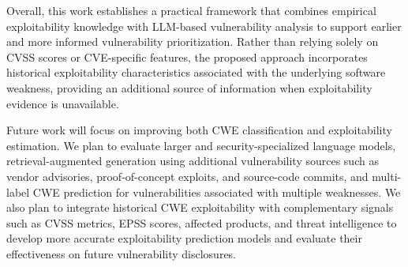 \documentclass[conference,compsoc]{IEEEtran}
\begin{document}
Overall, this work establishes a practical framework that combines empirical exploitability knowledge with LLM-based vulnerability analysis to support earlier and more informed vulnerability prioritization. Rather than relying solely on CVSS scores or CVE-specific features, the proposed approach incorporates historical exploitability characteristics associated with the underlying software weakness, providing an additional source of information when exploitability evidence is unavailable.

Future work will focus on improving both CWE classification and exploitability estimation. We plan to evaluate larger and security-specialized language models, retrieval-augmented generation using additional vulnerability sources such as vendor advisories, proof-of-concept exploits, and source-code commits, and multi-label CWE prediction for vulnerabilities associated with multiple weaknesses. We also plan to integrate historical CWE exploitability with complementary signals such as CVSS metrics, EPSS scores, affected products, and threat intelligence to develop more accurate exploitability prediction models and evaluate their effectiveness on future vulnerability disclosures.






\end{document}
